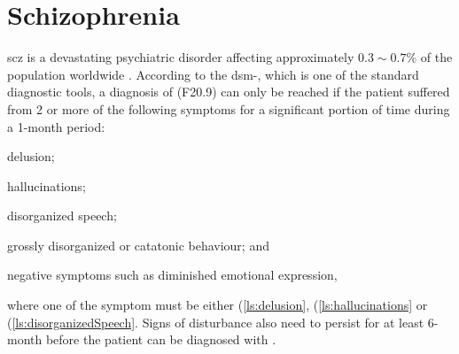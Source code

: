 \documentclass[12pt]{scrbook}
\newcommand{\rom}[1]{\uppercase\expandafter{\romannumeral #1\relax}}
\newcommand*{\glng}{\glsentrylong}
\begin{document}
	\section{Schizophrenia}
	\Gls{scz} is a devastating psychiatric disorder affecting approximately $0.3\sim0.7\%$ of the population worldwide \citep{AmericanPsychiatricAssociation2013}.
	According to the \gls{dsm}-\rom{5}, which is one of the standard diagnostic tools, a diagnosis of \glng{scz} (F20.9) can only be reached if the patient suffered from 2 or more of the following symptoms for a significant portion of time during a 1-month period: 
	\begin{enumerate*}[label=\arabic*\upshape)]
		\item delusion; \label{ls:delusion}
		\item hallucinations;\label{ls:hallucinations}
		\item disorganized speech;\label{ls:disorganizedSpeech}
		\item grossly disorganized or catatonic behaviour; and\label{ls:catatonicBehavior}
		\item negative symptoms such as diminished emotional expression,\label{ls:negativeSymptoms}
	\end{enumerate*}  where one of the symptom must be either (\ref{ls:delusion}, (\ref{ls:hallucinations} or (\ref{ls:disorganizedSpeech}.
	Signs of disturbance also need to persist for at least 6-month before the patient can be diagnosed with \glng{scz}.
	
\end{document}
